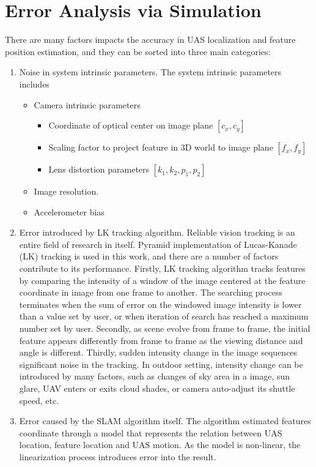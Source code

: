 \chapter{Error Analysis via Simulation}\label{ch:simulation}
There are many factors impacts the accuracy in UAS localization and 
feature position estimation, and they can be sorted into three main 
categories: 

\begin{enumerate}
  \item Noise in system intrinsic parameters. The system intrinsic
  parameters includes
  \begin{itemize}
    \item Camera intrinsic parameters
    \begin{itemize}
      \item Coordinate of optical center on image plane $[c_{x}, c_{y}]$
      \item Scaling factor to project feature in 3D world to image
      plane $ [f_{x}, f_{y}]$
      \item Lens distortion parameters $[k_{1}, k_{2}, p_{1}, p_{2}]$
    \end{itemize}
    \item Image resolution.
    \item Accelerometer bias 
  \end{itemize}
  \item Error introduced by LK tracking algorithm. Reliable vision
  tracking is an entire field of research in itself. Pyramid
  implementation of Lucas-Kanade (LK) tracking is used in this work,
  and there are a number of factors contribute to its performance.
  Firstly, LK tracking algorithm tracks features by comparing the
  intensity of a window of the image centered at the feature
  coordinate in image from one frame to another. The searching process
  terminates when the sum of error on the windowed image intensity is
  lower than a value set by user, or when iteration of search has
  reached a maximum number set by user. Secondly, as scene evolve from
  frame to frame, the initial feature appears differently from frame
  to frame as the viewing distance and angle is different. Thirdly,
  sudden intensity change in the image sequences significant noise in
  the tracking. In outdoor setting, intensity change can be introduced
  by many factors, such as changes of sky area in a image, sun glare,
  UAV enters or exits cloud shades, or camera auto-adjust its shuttle
  speed, etc.
  \item Error caused by the SLAM algorithm itself. The algorithm
  estimated features coordinate through a model that represents the
  relation between UAS location, feature location and UAS motion. As
  the model is non-linear, the linearization process introduces error
  into the result.
\end{enumerate}

